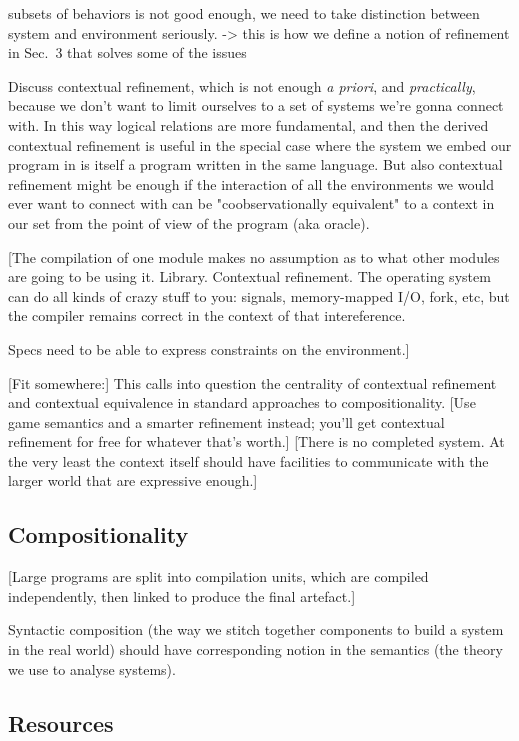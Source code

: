 \documentclass[sigplan,10pt,review,anonymous]{acmart}
\begin{document}
subsets of behaviors is not good enough,
we need to take distinction between system and environment seriously.
-> this is how we define a notion of refinement in Sec.~3
that solves some of the issues

Discuss contextual refinement,
which is not enough \emph{a priori}, and \emph{practically},
because we don't want to limit ourselves to a set of systems we're gonna connect with.
In this way logical relations are more fundamental,
and then the derived contextual refinement is useful
in the special case where the system we embed our program in
is itself a program written in the same language.
But also contextual refinement might be enough
if the interaction of all the environments we would ever want to connect with
can be "coobservationally equivalent" to a context in our set
from the point of view of the program (aka oracle).

[The compilation of one module
makes no assumption as to what other modules are going to be using it.
Library. Contextual refinement.
The operating system can do all kinds of crazy stuff to you:
signals, memory-mapped I/O, fork, etc,
but the compiler remains correct in the context of that intereference.

Specs need to be able to express constraints on the environment.]

[Fit somewhere:]
This calls into question
the centrality of contextual refinement and contextual equivalence
in standard approaches to compositionality.
[Use game semantics and a smarter refinement instead;
you'll get contextual refinement for free
for whatever that's worth.]
[There is no completed system.
At the very least the context itself
should have facilities to communicate with the larger world
that are expressive enough.]


\subsection{Compositionality} %

[Large programs are split into compilation units,
which are compiled independently,
then linked to produce the final artefact.]

Syntactic composition
(the way we stitch together components to build a system in the real world)
should have corresponding notion
in the semantics
(the theory we use to analyse systems).


\subsection{Resources} %
\end{document}
